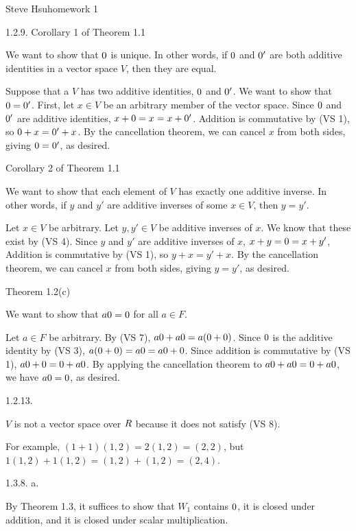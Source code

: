 \def\zero{{\sl 0}}
\def\real{{\sl R}}
\centerline{Steve Hsu\hfill homework 1}
\medskip\goodbreak
\item{1.2.9.} Corollary 1 of Theorem 1.1

We want to show that $\zero$ is unique.
In other words, if $\zero$ and $\zero'$ are both additive identities
in a vector space $V$, then they are equal.

Suppose that a $V$ has two additive identities, $\zero$ and $\zero'$.
We want to show that $\zero = \zero'$.
First, let $x \in V$ be an arbitrary member of the vector space.
Since $\zero$ and $\zero'$ are additive identities,
$x + \zero = x = x + \zero'$.
Addition is commutative by (VS 1), so $\zero + x = \zero' + x$.
By the cancellation theorem, we can cancel $x$ from both sides,
giving $\zero = \zero'$, as desired.

\item{} Corollary 2 of Theorem 1.1

We want to show that each element of $V$ has exactly one additive inverse.
In other words, if $y$ and $y'$ are additive inverses of some $x \in V$,
then $y = y'$.

Let $x \in V$ be arbitrary.
Let $y, y' \in V$ be additive inverses of $x$.
We know that these exist by (VS 4).
Since $y$ and $y'$ are additive inverses of $x$,
$x + y = \zero = x + y'$,
Addition is commutative by (VS 1), so $y + x = y' + x$.
By the cancellation theorem, we can cancel $x$ from both sides,
giving $y = y'$, as desired.

\item{} Theorem 1.2(c)

We want to show that $a\zero = \zero$ for all $a \in F$.

Let $a \in F$ be arbitrary.
By (VS 7), $a\zero + a\zero = a(\zero + \zero)$.
Since $\zero$ is the additive identity by (VS 3),
$a(\zero + \zero) = a\zero = a\zero + \zero$.
Since addition is commutative by (VS 1), $a\zero + \zero = \zero + a\zero$.
By applying the cancellation theorem to $a\zero + a\zero = \zero + a\zero$,
we have $a\zero = \zero$, as desired.
\medskip\goodbreak
\item{1.2.13.}

$V$ is not a vector space over $\real$
because it does not satisfy (VS 8).

For example, $(1 + 1)(1,2) = 2(1,2) = (2,2)$,
but $1(1,2) + 1(1,2) = (1,2) + (1,2) = (2,4)$.
\medskip\goodbreak
\item{1.3.8.} a.

By Theorem 1.3, it suffices to show that
$W_1$ contains $\zero$, it is closed under addition,
and it is closed under scalar multiplication.

